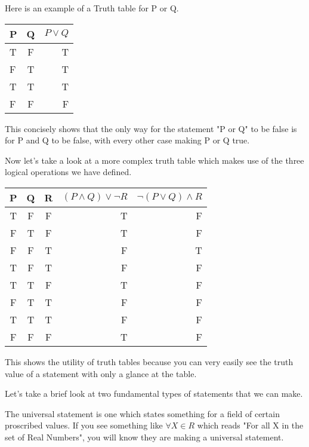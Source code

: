 Here is an example of a Truth table for P or Q.
\begin{example}
\begin{center}
\begin{tabular} {| l | c || r |}
  \hline
  P & Q & $P \lor Q$ \\ \hline
  T & F & T \\ \hline
  F & T & T \\ \hline
  T & T & T \\ \hline
  F & F & F \\ \hline  
\end{tabular}
\end{center}
\end{example}
This concisely shows that the only way for the statement "P or Q" to be false is for P and Q to be false, with every other case making P or Q true. \newline

Now let's take a look at a more complex truth table which makes use of the three logical operations we have defined.
\begin{example}
\begin{center}
\begin{tabular} {| c | c | c || r | r |}
  \hline
  P & Q & R & $(P \land Q) \lor \lnot R$ & $\lnot (P \lor Q) \land R$ \\ \hline
  T & F & F & T & F \\ \hline
  F & T & F & T & F \\ \hline
  F & F & T & F & T \\ \hline
  T & F & T & F & F \\ \hline  
  T & T & F & T & F \\ \hline
  F & T & T & F & F \\ \hline
  T & T & T & F & F \\ \hline
  F & F & F & T & F \\ \hline
\end{tabular}
\end{center}
\end{example}
This shows the utility of truth tables because you can very easily see the truth value of a statement with only a glance at the table. \newline

Let's take a brief look at two fundamental types of statements that we can make. \newline

The universal statement is one which states something for a field of certain proscribed values. If you see something like $\forall X \in R$ which reads "For all X in the set of Real Numbers", you will know they are making a universal statement. \newline

